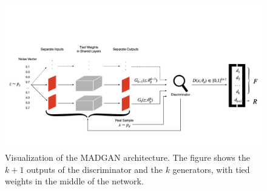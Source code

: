\begin{figure}[htbp]
    \centering
    \vspace{-4em}
    \includegraphics[width=.9\textwidth]{abb/arch_madgan.png}
    \caption{Visualization of the MADGAN architecture. The figure shows the \(k+1\) outputs of the discriminator and the \(k\) generators, with tied weights in the middle of the network.}
    \label{fig:figure_madgan_arch}
\end{figure}


